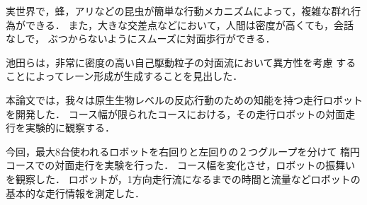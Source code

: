 実世界で，蜂，アリなどの昆虫が簡単な行動メカニズムによって，複雑な群れ行為ができる．
また，大きな交差点などにおいて，人間は密度が高くても，会話なしで，
ぶつからないようにスムーズに対面歩行ができる．

池田ら\cite{ikeda16}は，非常に密度の高い自己駆動粒子の対面流において異方性を考慮
することによってレーン形成が生成することを見出した．

本論文では，我々は原生生物レベルの反応行動のための知能を持つ走行ロボットを開発した．
コース幅が限られたコースにおける，その走行ロボットの対面走行を実験的に観察する．

今回，最大8台使われるロボットを右回りと左回りの２つグループを分けて
楕円コースでの対面走行を実験を行った．
コース幅を変化させ，ロボットの振舞いを観察した．
ロボットが，1方向走行流になるまでの時間と流量などロボットの基本的な走行情報を測定した．
